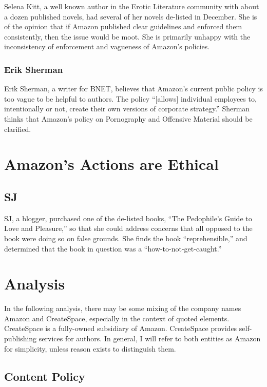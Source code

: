 \documentclass[11pt]{article}
\begin{document}
\begin{multicols}{2}
Selena Kitt, a well known author in the Erotic Literature community with about a dozen published novels, had several of her novels de-listed in December.  She is of the opinion that if Amazon published clear guidelines and enforced them consistently, then the issue would be moot.  She is primarily unhappy with the inconsistency of enforcement and vagueness of Amazon's policies. \cite{KittSelfPubRevolution}

\subsubsection{Erik Sherman}

Erik Sherman, a writer for BNET, believes that Amazon's current public policy is too vague to be helpful to authors.  The policy  ``[allows] individual employees to, intentionally or not, create their own versions of corporate strategy.'' \cite{ShermanAmazonExecs} Sherman thinks that Amazon's policy on Pornography and Offensive Material should be clarified.

\section{Amazon's Actions are Ethical}

\subsection{SJ}

SJ, a blogger, purchased one of the de-listed books, ``The Pedophile's Guide to Love and Pleasure,'' so that she could address concerns that all opposed to the book were doing so on false grounds.  She finds the book ``reprehensible,'' and determined that the book in question was a ``how-to-not-get-caught.'' \cite{iasshole}

\section{Analysis}

In the following analysis, there may be some mixing of the company names Amazon and CreateSpace, especially in the context of quoted elements.  CreateSpace is a fully-owned subsidiary of Amazon.  CreateSpace provides self-publishing services for authors.  In general, I will refer to both entities as Amazon for simplicity, unless reason exists to distinguish them.

\subsection{Content Policy}


\end{multicols}
\end{document}
